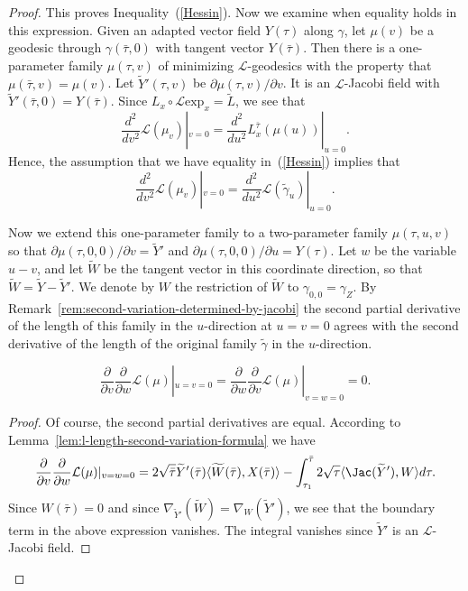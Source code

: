 \begin{proof}
This proves Inequality~(\ref{Hessin}). Now we examine when equality
holds in this expression. Given an adapted vector field $Y(\tau)$
along $\gamma$, let $\mu(v)$ be a geodesic through
$\gamma(\bar\tau,0)$ with tangent vector $Y(\bar\tau)$. Then there
is a one-parameter family $\mu(\tau,v)$ of minimizing ${\mathcal
L}$-geodesics with the property that $\mu(\bar\tau,v)=\mu(v)$. Let
$\widetilde Y'(\tau,v)$ be $\partial\mu(\tau,v)/\partial v$. It is
an ${\mathcal L}$-Jacobi field with $\widetilde
Y'(\bar\tau,0)=Y(\bar\tau)$. Since $L_x\circ {\mathcal L}\mathrm{exp}_x=\widetilde L$, we see that
$$\frac{d^2}{d v^2}{\mathcal
L}(\mu_v)|_{v=0}=\frac{d^2}{du^2}L^{\bar \tau}_x(\mu(u))|_{u=0}.$$
Hence, the assumption that we have equality in~(\ref{Hessin})
implies that
$$\frac{d^2}{d v^2}{\mathcal
L}(\mu_v)|_{v=0}=\frac{d^2}{d u^2}{\mathcal L}(\tilde\gamma_u)|_{u=0}.$$

 Now we extend this
one-parameter family to a two-parameter family $\mu(\tau,u,v)$ so
that $\partial\mu(\tau,0,0)/\partial v=\widetilde Y'$ and
$\partial\mu(\tau,0,0)/\partial u=Y(\tau)$. Let $w$ be the variable
$u-v$, and let $\widetilde W$ be the tangent vector in this
coordinate direction, so that $\widetilde W=\widetilde Y-\widetilde
Y'$. We denote by $W$ the restriction of $\widetilde W$ to
$\gamma_{0,0}=\gamma_Z$. By Remark~\ref{rem:second-variation-determined-by-jacobi} the second
partial derivative of the length of this family in the $u$-direction
at $u=v=0$ agrees with the second derivative of the length of the
original family $\widetilde \gamma$ in the $u$-direction.


\begin{claim}\label{claim:mixed-partials-vanish}
$$\frac{\partial}{\partial v}\frac{\partial}{\partial w}{\mathcal L}(\mu)|_{u=v=0}=
\frac{\partial}{\partial w}\frac{\partial}{\partial v}{\mathcal
L}(\mu)|_{v=w=0}=0.$$
\end{claim}


\begin{proof}
Of course, the second partial derivatives are equal. According to
Lemma~\ref{lem:l-length-second-variation-formula} we have
$$\frac{\partial}{\partial v}\frac{\partial}{\partial w}{\mathcal L}(\mu)|_{v=w=0}
=2\sqrt{\bar\tau} \widetilde Y'(\bar\tau)\langle \widetilde
W(\bar\tau),X(\bar\tau)\rangle-\int_{\tau_1}^{\bar\tau}2\sqrt{\tau}\langle
\Jac(\widetilde Y'),W\rangle d\tau.$$ Since $W(\bar\tau)=0$ and
since $\nabla_{\widetilde Y'}(\widetilde W)=\nabla_W(\widetilde
Y')$, we see that the boundary term in the above expression
vanishes. The integral vanishes since $\widetilde Y'$ is an
${\mathcal L}$-Jacobi field.
\end{proof}




\end{proof}
